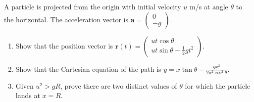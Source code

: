 \vspace{1em}

\begin{problem}
A particle is projected from the origin with initial velocity $u$ m/s at angle $\theta$ to the horizontal. The acceleration vector is $\mathbf{a} = \begin{pmatrix} 0 \\ -g \end{pmatrix}$.
\begin{enumerate}[label=(\roman*)]
    \item Show that the position vector is $\mathbf{r}(t) = \begin{pmatrix} ut\cos\theta \\ ut\sin\theta - \tfrac{1}{2}gt^2 \end{pmatrix}$.
    \item Show that the Cartesian equation of the path is $y = x\tan\theta - \tfrac{gx^2}{2u^2\cos^2\theta}$.
    \item Given $u^2 > gR$, prove there are two distinct values of $\theta$ for which the particle lands at $x = R$.
\end{enumerate}
\end{problem}


